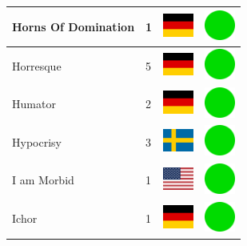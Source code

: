 \documentclass[12pt, a4paper, twoside]{report}
\begin{document}
\begin{center}
\begin{longtable}{|p{5cm}|p{2cm}|p{2cm}|p{2cm}|}
			Horns Of Domination & 1 & \includegraphics[width=1cm]{4x3/de} & \includegraphics[width=1cm]{likes/y} \\ \hline
			Horresque & 5 & \includegraphics[width=1cm]{4x3/de} & \includegraphics[width=1cm]{likes/y} \\ \hline
			Humator & 2 & \includegraphics[width=1cm]{4x3/de} & \includegraphics[width=1cm]{likes/y} \\ \hline
			Hypocrisy & 3 & \includegraphics[width=1cm]{4x3/se} & \includegraphics[width=1cm]{likes/y} \\ \hline
			I am Morbid & 1 & \includegraphics[width=1cm]{4x3/us} & \includegraphics[width=1cm]{likes/y} \\ \hline
			Ichor & 1 & \includegraphics[width=1cm]{4x3/de} & \includegraphics[width=1cm]{likes/y} \\ \hline

\end{longtable}
\end{center}
\end{document}
